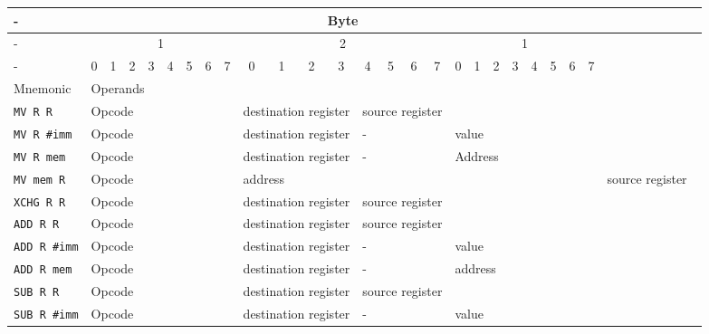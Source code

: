 \newcommand{\code}[1]{\texttt{#1}}


\begin{tabular}{|l|c|c|c|c|c|c|c|c|c|c|c|c|c|c|c|c|c|c|c|c|c|c|c|c|}
    \hline
    - & \multicolumn{24}{|c|}{Byte} \\ \hline
    - & \multicolumn{8}{|c|}{1} & \multicolumn{8}{|c|}{2} & \multicolumn{8}{|c|}{1} \\ \hline 
    - & 0 & 1 & 2 & 3 & 4 & 5 & 6 & 7 & 0 & 1 & 2 & 3 & 4 & 5 & 6 & 7 & 0 & 1 & 2 & 3 & 4 & 5 & 6 & 7 \\ \hline
    Mnemonic & \multicolumn{24}{|l|}{Operands} \\ \hline
    \code{MV R R} & \multicolumn{8}{|l|}{Opcode} & \multicolumn{4}{|l|}{destination register} & \multicolumn{4}{|l|}{source register} \\ \hline
    \code{MV R #imm} & \multicolumn{8}{|l|}{Opcode} & \multicolumn{4}{|l|}{destination register} & \multicolumn{4}{|l|}{-} & \multicolumn{16}{|l|}{value} \\ \hline
    \code{MV R mem} & \multicolumn{8}{|l|}{Opcode} & \multicolumn{4}{|l|}{destination register} & \multicolumn{4}{|l|}{-} & \multicolumn{16}{|l|}{Address} \\ \hline
    \code{MV mem R} & \multicolumn{8}{|l|}{Opcode} & \multicolumn{16}{|l|}{address} & \multicolumn{8}{|l|}{source register} \\ \hline
    \code{XCHG R R} & \multicolumn{8}{|l|}{Opcode} & \multicolumn{4}{|l|}{destination register} & \multicolumn{4}{|l|}{source register} \\ \hline
    \code{ADD R R} & \multicolumn{8}{|l|}{Opcode} & \multicolumn{4}{|l|}{destination register} & \multicolumn{4}{|l|}{source register} \\ \hline
    \code{ADD R #imm} & \multicolumn{8}{|l|}{Opcode} & \multicolumn{4}{|l|}{destination register} & \multicolumn{4}{|l|}{-} & \multicolumn{16}{|l|}{value} \\ \hline
    \code{ADD R mem} & \multicolumn{8}{|l|}{Opcode} & \multicolumn{4}{|l|}{destination register} & \multicolumn{4}{|l|}{-} & \multicolumn{16}{|l|}{address} \\ \hline
    \code{SUB R R} & \multicolumn{8}{|l|}{Opcode} & \multicolumn{4}{|l|}{destination register} & \multicolumn{4}{|l|}{source register} \\ \hline
    \code{SUB R #imm} & \multicolumn{8}{|l|}{Opcode} & \multicolumn{4}{|l|}{destination register} & \multicolumn{4}{|l|}{-} & \multicolumn{16}{|l|}{value} \\ \hline

\end{tabular}
